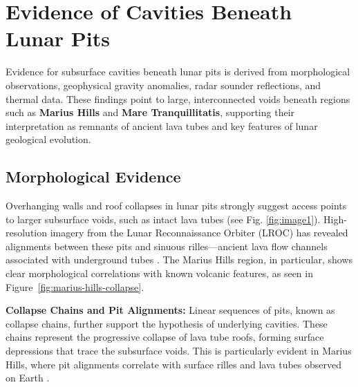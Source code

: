 \graphicspath{{img/ch4}}

\section{Evidence of Cavities Beneath Lunar Pits}

Evidence for subsurface cavities beneath lunar pits is derived from morphological observations, geophysical gravity anomalies, radar sounder reflections, and thermal data. These findings point to large, interconnected voids beneath regions such as \textbf{Marius Hills} and \textbf{Mare Tranquillitatis}, supporting their interpretation as remnants of ancient lava tubes and key features of lunar geological evolution.

\subsection{Morphological Evidence}

Overhanging walls and roof collapses in lunar pits strongly suggest access points to larger subsurface voids, such as intact lava tubes (see Fig. \ref{fig:image1}). High-resolution imagery from the Lunar Reconnaissance Orbiter (LROC) has revealed alignments between these pits and sinuous rilles—ancient lava flow channels associated with underground tubes \citep{lunar-pits-entrances-to-caves, grails-gradients-mariushills}. The Marius Hills region, in particular, shows clear morphological correlations with known volcanic features, as seen in Figure~\ref{fig:marius-hills-collapse}.

\textbf{Collapse Chains and Pit Alignments:} Linear sequences of pits, known as collapse chains, further support the hypothesis of underlying cavities. These chains represent the progressive collapse of lava tube roofs, forming surface depressions that trace the subsurface voids. This is particularly evident in Marius Hills, where pit alignments correlate with surface rilles and lava tubes observed on Earth \citep{new-wagner, cavities-selene-lavatubes}.

